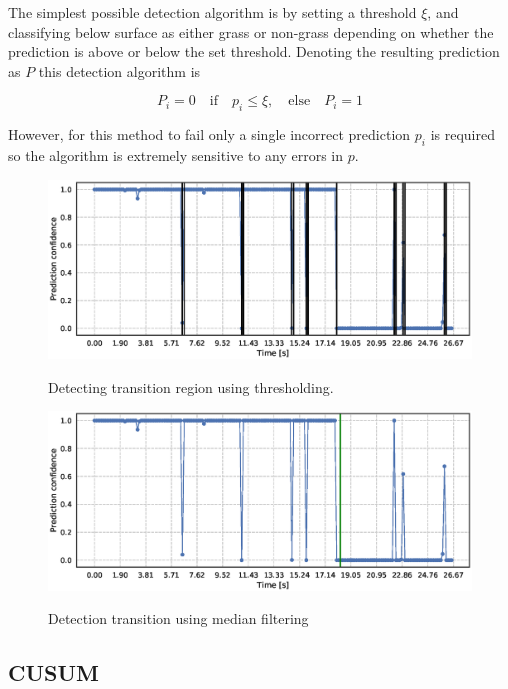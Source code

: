 The simplest possible detection algorithm is by setting a threshold $\xi$, and classifying below surface as either grass or non-grass depending on whether the prediction is above or below the set threshold. Denoting the resulting prediction as $P$ this detection algorithm is 

\begin{equation}
	P_i=0 \quad\text{if}\quad p_i\leq\xi, \quad
	\text{else} \quad P_i=1
\end{equation}

However, for this method to fail only a single incorrect prediction $p_i$ is required so the algorithm is extremely sensitive to any errors in $p$.

\begin{figure}
	\includegraphics[scale=0.5]{figs_temp/detect_thresh}
	\label{fig:detect_thresh}
	\caption{Detecting transition region using thresholding.}
\end{figure}

\begin{figure}
	\includegraphics[scale=0.5]{figs_temp/detect_median}
	\label{fig:detect_median}
	\caption{Detection transition using median filtering}
\end{figure}

\subsection{CUSUM}

